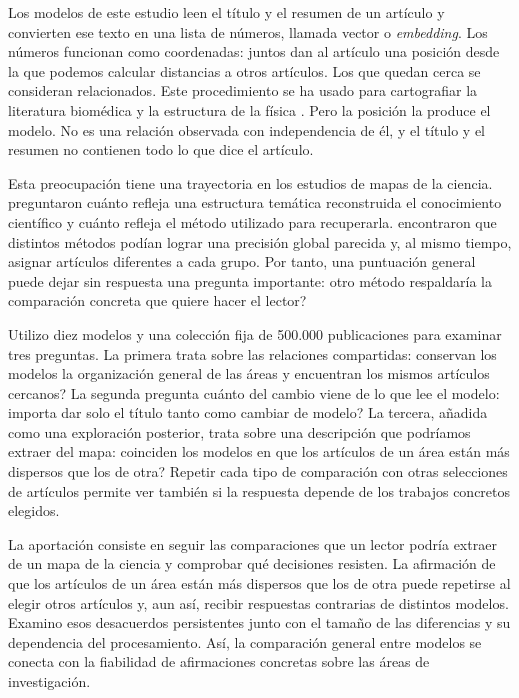 \documentclass[12pt]{article}
\begin{document}
Los modelos de este estudio leen el título y el resumen de un artículo y convierten ese texto en una lista de números, llamada vector o \emph{embedding}. Los números funcionan como coordenadas: juntos dan al artículo una posición desde la que podemos calcular distancias a otros artículos. Los que quedan cerca se consideran relacionados. Este procedimiento se ha usado para cartografiar la literatura biomédica y la estructura de la física \citep{refbe130e2973,refc0e2cc29e0}. Pero la posición la produce el modelo. No es una relación observada con independencia de él, y el título y el resumen no contienen todo lo que dice el artículo.

Esta preocupación tiene una trayectoria en los estudios de mapas de la ciencia. \citet{refa0d2d707e6} preguntaron cuánto refleja una estructura temática reconstruida el conocimiento científico y cuánto refleja el método utilizado para recuperarla. \citet{ref6a2f5912bc} encontraron que distintos métodos podían lograr una precisión global parecida y, al mismo tiempo, asignar artículos diferentes a cada grupo. Por tanto, una puntuación general puede dejar sin respuesta una pregunta importante: \textquestiondown{}otro método respaldaría la comparación concreta que quiere hacer el lector?

Utilizo diez modelos y una colección fija de 500.000 publicaciones para examinar tres preguntas. La primera trata sobre las relaciones compartidas: \textquestiondown{}conservan los modelos la organización general de las áreas y encuentran los mismos artículos cercanos? La segunda pregunta cuánto del cambio viene de lo que lee el modelo: \textquestiondown{}importa dar solo el título tanto como cambiar de modelo? La tercera, añadida como una exploración posterior, trata sobre una descripción que podríamos extraer del mapa: \textquestiondown{}coinciden los modelos en que los artículos de un área están más dispersos que los de otra? Repetir cada tipo de comparación con otras selecciones de artículos permite ver también si la respuesta depende de los trabajos concretos elegidos.

La aportación consiste en seguir las comparaciones que un lector podría extraer de un mapa de la ciencia y comprobar qué decisiones resisten. La afirmación de que los artículos de un área están más dispersos que los de otra puede repetirse al elegir otros artículos y, aun así, recibir respuestas contrarias de distintos modelos. Examino esos desacuerdos persistentes junto con el tamaño de las diferencias y su dependencia del procesamiento. Así, la comparación general entre modelos se conecta con la fiabilidad de afirmaciones concretas sobre las áreas de investigación.
\end{document}
